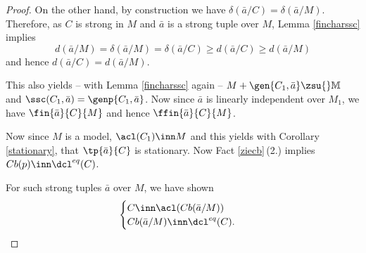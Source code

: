 \begin{proof}
\medskip
On the other hand, by construction we have $\delta(\bar a/C)=\delta(\bar a/M)$. %
Therefore, as $C$ is strong in $M$ and $\bar a$ is a strong tuple over $M$, Lemma \ref{fincharssc} implies
$$
d(\bar a/M)=\delta(\bar a/M)=\delta(\bar a/C)\geq d(\bar a/C)\geq d(\bar a/M)
$$
and hence $d(\bar a/C)=d(\bar a/M)$.

This also yields -- with Lemma \ref{fincharssc} again --  $M+\gen{C_{1},\bar a}\zsu{}\mathbb{M}$ and $\ssc(C_{1},\bar a)
=\genp{C_{1},\bar a}$. Now since $\bar a$ is linearly independent over $M_{1}$, we have
$\fin{\bar a}{C}{M}$ and hence $\ffin{\bar a}{C}{M}$.

\medskip
Now since $M$ is a model, %
$\acl(C_{1})\inn M$ %
and this yields with Corollary \ref{stationary}, that $\tp{\bar a}{C}$
is stationary. Now Fact \ref{ziecb}\,(2.) implies $Cb(p)\inn\dcl^{eq}(C)$.

For such strong tuples $\bar a$ over $M$, %
we have shown
\begin{gather}\label{cibbi}
\begin{cases}C\inn\acl(Cb(\bar a/M))\\
Cb(\bar a/M)\inn\dcl^{eq}(C).\end{cases}
\end{gather}
\end{proof}
%
%
%
%
